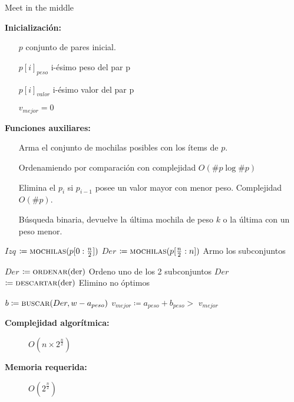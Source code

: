 \documentclass[fleqn, 11pt]{article}
\def\is{\coloneqq}
\begin{document}
\begin{algorithm}
\caption{Meet in the middle}
\begin{algorithmic}[1]
\item[\textbf{Inicialización:}]
\item[] \begin{itemize}
	\item[] $p$ conjunto de pares inicial.
	\item[] $p[i]_{peso}$ i-ésimo peso del par p
	\item[] $p[i]_{valor}$ i-ésimo valor del par p
	\item[] $v_{mejor} = 0$
\end{itemize}
\item[\textbf{Funciones auxiliares:}]
\item[] \begin{itemize}
	\setlength\itemsep{0.3em}
	\item[]  Arma el conjunto de mochilas posibles con
	los ítems de $p$.
	
	\item[]  Ordenamiendo por comparación con
	complejidad $O(\#p\log \#p)$
	
	\item[]  Elimina el $p_i$ si $p_{i-1}$ posee un
	valor mayor con menor peso. Complejidad $O(\#p)$.

	\item[]  Búsqueda binaria, devuelve la última
	mochila de peso $k$ o la última con un peso menor.
\end{itemize}
\Statex
{}
\State $Izq$ $\is \Call{mochilas}{p[0:\frac{n}{2}]}$
\State $Der$ $\is \Call{mochilas}{p[\frac{n}{2}:n]}$
\Comment Armo los subconjuntos

\State $Der$ $\is \Call{ordenar}{\text{der}}$
\Comment Ordeno uno de los 2 subconjuntos
\State $Der$ $\is \Call{descartar}{\text{der}}$
\Comment Elimino no óptimos

	\State $b \is \Call{buscar}{Der, w - a_{peso}}$
			\State  $v_{mejor} \is a_{peso} + b_{peso} > $
		\EndIf
	\EndIf
\EndFor
\State \Return $v_{mejor}$
\EndFunction
\end{algorithmic}
\begin{description}
	\item[\textbf{Complejidad algorítmica:}] $O(n \times 2^{\frac{n}{2}})$
	\item[\textbf{Memoria requerida:}] $O(2^{\frac{n}{2}})$
\end{description}
\end{algorithm}
\end{document}
